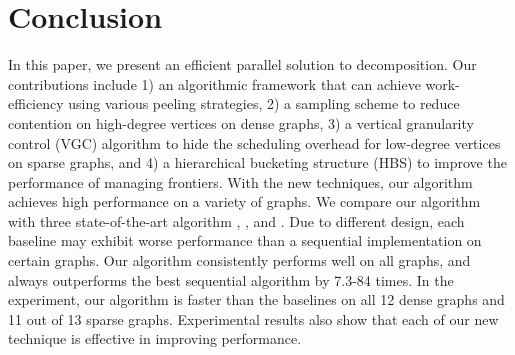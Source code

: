 \section{Conclusion} 
In this paper, we present an efficient parallel solution to \kcore{} decomposition.
Our contributions include 1) an algorithmic framework that can achieve work-efficiency using various peeling strategies,
2) a sampling scheme to reduce contention on high-degree vertices on dense graphs,
3) a vertical granularity control (VGC) algorithm to hide the scheduling overhead for low-degree vertices on sparse graphs,
and 4) a hierarchical bucketing structure (HBS) to improve the performance of managing frontiers. 
With the new techniques, our algorithm achieves high performance on a variety of graphs. 
We compare our algorithm with three state-of-the-art algorithm \Julienne{}, \Park{}, and \PKC{}.
Due to different design, each baseline may exhibit worse performance than a sequential implementation on certain graphs. 
Our algorithm consistently performs well on all graphs, and always outperforms the best sequential algorithm by 7.3-84 times. 
In the experiment, our algorithm is faster than the baselines on all 12 dense graphs and 11 out of 13 sparse graphs. 
Experimental results also show that each of our new technique is effective in improving performance. 
